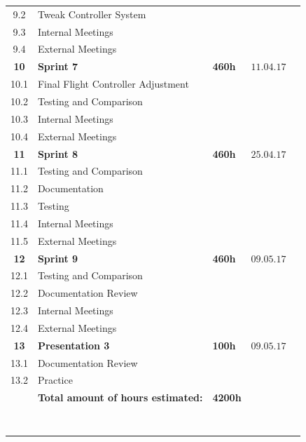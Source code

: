 \begin{center}
\begin{tabular}{cllll}
9.2     & Tweak Controller System &  & \\
9.3       & Internal Meetings      &    & 
\\\rowcolor{gainsboro}
9.4       & External Meetings      &    & \\
\textbf{10} & \textbf{Sprint 7}     & \textbf{460h}     & $11.04.17$ \\
\rowcolor{gainsboro}
10.1     & Final Flight Controller Adjustment &  & \\
10.2     & Testing and Comparison & & 
\\\rowcolor{gainsboro}
10.3       & Internal Meetings      &    & \\
10.4       & External Meetings      &    & 
\\\rowcolor{gainsboro}
\rowcolor{gainsboro}
\textbf{11} & \textbf{Sprint 8}     & \textbf{460h}    & $25.04.17$ \\
11.1     & Testing and Comparison              &  &  \\\rowcolor{gainsboro}
11.2     & Documentation &  &  \\
11.3     & Testing & &  \\\rowcolor{gainsboro}
11.4       & Internal Meetings      &    & \\
11.5       & External Meetings      &    & 
\\\rowcolor{gainsboro}
\rowcolor{gainsboro}
\textbf{12} & \textbf{Sprint 9}     & \textbf{460h}     & $09.05.17$ \\
12.1     & Testing and Comparison &  &  \\\rowcolor{gainsboro}
12.2     & Documentation Review &  & \\
12.3       & Internal Meetings      &    & 
\\\rowcolor{gainsboro}
12.4       & External Meetings      &    & \\
\textbf{13} & \textbf{Presentation 3}     & \textbf{100h}     & $09.05.17$ \\
\rowcolor{gainsboro}
13.1     & Documentation Review &  & \\
13.2     & Practice & & \\
\rowcolor{gainsboro}
         & \textbf{Total amount of hours estimated:} & \textbf{4200h} & 
         \\\\\\\\\
\end{tabular}                                                               
\end{center}



